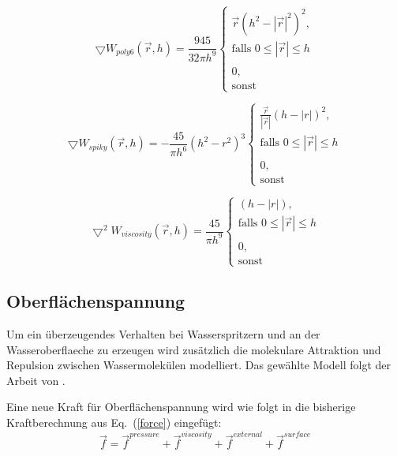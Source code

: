 \documentclass[a4paper]{paper}
\renewcommand{\eqref}[1]{Eq.~(\ref{#1})}
\begin{document}
\begin{equation}
\label{gradient_poly6}
\bigtriangledown W_{poly6}(\vec{r},h) = \frac{945}{32 \pi h^9} 
\begin{cases}
\vec{r}(h^2-|\vec{r}|^2)^2, \\ \text{falls } 0 \leq |\vec{r}| \leq h  \\
\\
0, \\ \text{sonst}
\end{cases}
\end{equation}

\begin{equation}
\label{spiky}
\bigtriangledown W_{spiky}(\vec{r},h) = -\frac{45}{\pi h^6} (h^2-r^2)^3
\begin{cases}
\frac{\vec{r}}{|\vec{r}|}(h-|r|)^2, \\ \text{falls } 0 \leq |\vec{r}| \leq h\\

\\ 0, \\ \text{sonst}
\end{cases}
\end{equation}

\begin{equation}
\label{viscosity}
\bigtriangledown^2 W_{viscosity}(\vec{r},h) = \frac{45}{\pi h^9} 
\begin{cases}
(h-|r|),

\\ \text{falls } 0 \leq |\vec{r}| \leq h \\
\\
0, 
\\ \text{sonst}
\end{cases}
\end{equation}


\subsection{Oberflächenspannung}
Um ein überzeugendes Verhalten bei Wasserspritzern und an der Wasseroberflaeche zu erzeugen wird zusätzlich die molekulare Attraktion und Repulsion zwischen Wassermolekülen modelliert. Das gewählte Modell folgt der Arbeit von \citep{SurfaceTension}.

Eine neue Kraft für Oberflächenspannung wird wie folgt in die bisherige Kraftberechnung aus \eqref{force} eingefügt:
\begin{equation}
\label{force_with_surface}
\vec{f} = \vec{f}^{pressure} + \vec{f}^{viscosity} + \vec{f}^{external} + \vec{f}^{surface}
\end{equation}
\end{document}
